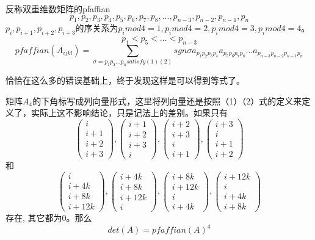 \documentclass[twoside,a4paper,CCT]{cctart}   %
\begin{document}
\begin{define}
 反称双重维数矩阵的pfaffian
    \begin{equation}p_{1},p_{2},p_{3},p_{4},p_{5},p_{6},p_{7},p_{8}
   ,...,p_{n-3},p_{n-2},p_{n-1},p_{n}\end{equation}
   $p_{i},p_{i+1},p_{i+2},p_{i+3}$的序关系为$p_{i}mod4=1,p_{i}mod4=2,p_{i}mod4=3,p_{i}mod4=4$。
   \begin{equation}p_{1}<p_{5}<...<p_{n-3}\end{equation}
   $$pfaffian(A_{ijkl})=\sum\limits_{\sigma=p_{1}p_{2}...p_{n}satisfy(1)(2)}sgn\sigma a_{p_{1}p_{2}p_{3}p_{4}}a_{p_{5}p_{6}p_{7}p_{8}}...a_{p_{n-3}p_{n-2}p_{n-1}p_{n}}$$
\end{define}
恰恰在这么多的错误基础上，终于发现这样是可以得到等式了。
\begin{theorem}
矩阵$A_{4}$的下角标写成列向量形式，这里将列向量还是按照（1）（2）式的定义来定义了，实际上这不影响结论，只是记法上的差别。如果只有$$\begin{pmatrix}i\\i+1\\i+2\\i+3 \end{pmatrix},\begin{pmatrix}i+1\\i+2\\i+3\\i \end{pmatrix},\begin{pmatrix}i+2\\i+3\\i\\i+1 \end{pmatrix},\begin{pmatrix}i+3\\i\\i+1\\i+2 \end{pmatrix}$$和$$\begin{pmatrix}i\\i+4k\\i+8k\\i+12k \end{pmatrix},\begin{pmatrix}i+4k\\i+8k\\i+12k\\i \end{pmatrix},\begin{pmatrix}i+8k\\i+12k\\i\\i+4k \end{pmatrix},\begin{pmatrix}i+12k\\i\\i+4k\\i+8k \end{pmatrix}$$ 存在, 其它都为0。那么$$det(A)=pfaffian(A)^{4}$$
\end{theorem}
\end{document}
